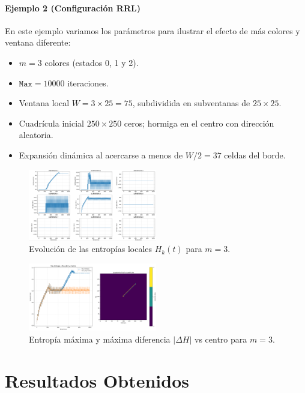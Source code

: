 \documentclass[twocolumn]{article}
\begin{document}
\paragraph{Ejemplo 2 (Configuración RRL)}
En este ejemplo variamos los parámetros para ilustrar el efecto de más colores y ventana diferente:
\begin{itemize}
  \item \(m=3\) colores (estados 0, 1 y 2).  
  \item \(\texttt{Max}=10000\) iteraciones.  
  \item Ventana local \(W=3\times25=75\), subdividida en subventanas de \(25\times25\).  
  \item Cuadrícula inicial \(250\times250\) ceros; hormiga en el centro con dirección aleatoria.  
  \item Expansión dinámica al acercarse a menos de \(W/2=37\) celdas del borde.
\end{itemize}


 
\begin{figure}[H]
  \centering
  \includegraphics[width=0.5\textwidth]{ejemplo2.png}
  \caption{Evolución de las entropías locales \(H_k(t)\) para \(m=3\).}
  \label{fig:entropias_locales_m3}
\end{figure}

\begin{figure}[H]
  \centering
  \includegraphics[width=0.5\textwidth]{ejemplo21.png}
  \caption{Entropía máxima y máxima diferencia \(|\Delta H|\) vs centro para \(m=3\).}
  \label{fig:max_vs_diff_m3}
\end{figure}

\section{Resultados Obtenidos}
\end{document}
